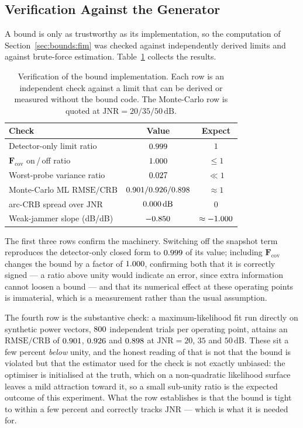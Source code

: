\documentclass[journal]{IEEEtran}
\newcommand{\JNR}{\mathrm{JNR}}
\newcommand{\CRB}{\mathrm{CRB}}
\newcommand{\RMSE}{\mathrm{RMSE}}
\newcommand{\dB}{\,\mathrm{dB}}
\begin{document}
\subsection{Verification Against the Generator}
\label{sec:bounds:verify}

A bound is only as trustworthy as its implementation, so the computation of
Section~\ref{sec:bounds:fim} was checked against independently derived limits
and against brute-force estimation. Table~\ref{tab:crbverify} collects the
results.

\begin{table}[!t]
\centering
\caption{Verification of the bound implementation. Each row is an independent
check against a limit that can be derived or measured without the bound code.
The Monte-Carlo row is quoted at $\JNR = 20/35/50\dB$.}
\label{tab:crbverify}
\small
\setlength{\tabcolsep}{4pt}
\begin{tabular}{@{}lcc@{}}
\toprule
Check & Value & Expect \\
\midrule
Detector-only limit ratio & $0.999$ & $1$ \\
$\mathbf{F}_{\mathrm{cov}}$ on\,/\,off ratio & $1.000$ & $\le 1$ \\
Worst-probe variance ratio & $0.027$ & $\ll 1$ \\
Monte-Carlo ML $\RMSE/\CRB$ & $0.901/0.926/0.898$ & $\approx 1$ \\
arc-$\CRB$ spread over $\JNR$ & $\jnrFlatSpread\dB$ & $0$ \\
Weak-jammer slope (dB/dB) & $-0.850$ & $\approx -1.000$ \\
\bottomrule
\end{tabular}
\end{table}

The first three rows confirm the machinery. Switching off the snapshot term
reproduces the detector-only closed form to $0.999$ of its value;
including $\mathbf{F}_{\mathrm{cov}}$ changes the bound by a factor of
$1.000$, confirming both that it is correctly signed --- a ratio above
unity would indicate an error, since extra information cannot loosen a bound
--- and that its numerical effect at these operating points is immaterial,
which is a measurement rather than the usual assumption.

The fourth row is the substantive check: a maximum-likelihood fit run directly
on synthetic power vectors, $800$ independent trials per operating
point, attains an $\RMSE/\CRB$ of $0.901$, $0.926$ and $0.898$ at
$\JNR = 20$, $35$ and $50\dB$. These sit a few percent \emph{below} unity, and
the honest reading of that is not that the bound is violated but that the
estimator used for the check is not exactly unbiased: the optimiser is
initialised at the truth, which on a non-quadratic likelihood surface leaves a
mild attraction toward it, so a small sub-unity ratio is the expected outcome
of this experiment. What the row establishes is that the bound is tight to
within a few percent and correctly tracks $\JNR$ --- which is what it is
needed for.
\end{document}
